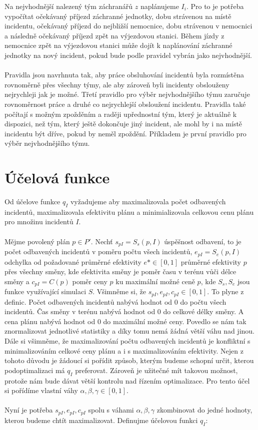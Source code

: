 Na nejvhodnější nalezený tým záchranářů $z$ naplánujeme $I_i$. Pro to je potřeba vypočítat očekávaný příjezd záchranné jednotky, dobu strávenou na místě incidentu, očekávaný příjezd
do nejbližší nemocnice, dobu strávenou v nemocnici a následně očekávaný příjezd zpět na výjezdovou stanici.
Během jízdy z nemocnice zpět na výjezdovou stanici může dojít k naplánování záchranné jednotky na nový incident, pokud bude podle pravidel vybrán jako nejvhodnější.
\\
\\
Pravidla jsou navrhnuta tak, aby práce obsluhování incidentů byla rozmístěna rovnoměrně přes všechny týmy, ale aby zároveň byli incidenty obslouženy nejrychleji jak je možné.
Třetí pravidlo pro výběr nejvhodnějšího týmu zaručuje rovnoměrnost práce a druhé co nejrychlejší obsloužení incidentu.
Pravidla také počítají s možným zpožděním a raději upřednostní tým, který je aktuálně k dispozici, než tým, který ještě dokončuje jiný incident, ale mohl by i na místě incidentu
být dříve, pokud by neměl zpoždění. Příkladem je první pravidlo pro výběr nejvhodnějšího týmu.

\section{Účelová funkce}

Od účelove funkce $q_I$ vyžadujeme aby maximalizovala počet odbavených incidentů, maximalizovala efektivitu plánu a minimializovala celkovou cenu plánu pro množinu incidentů $I$.
\\
\\
Mějme povolený plán $p \in P'$. Nechť $s_{pI} = S_s(p, I)$ úspěšnost odbavení, to je počet odbavených incidentů v poměru počtu všech incidentů,
$e_{pI} = S_e(p, I)$ odchylka od požadované průměrné efektivity $e* \in [0, 1]$ průměrné efektivity $p$ přes všechny směny,
kde efektivita směny je poměr času v terénu vůči délce směny a $c_{pI} = C(p)$ poměr ceny $p$ ku maximální možné ceně $p$,
kde $S_s, S_e$ jsou funkce využívající simulaci $S$. Všimněme si, že $s_{pI}, e_{pI}, c_{pI} \in [0, 1]$.
To plyne z definic. Počet odbavených incidentů nabývá hodnot od 0 do počtu všech incidentů.
Čas směny v terénu nabývá hodnot od 0 do celkové délky směny. A cena plánu nabývá hodnot od 0 do maximální možné ceny.
Povedlo se nám tak znormalizovat jednotlivé statistiky a díky tomu nemá žádná větší váhu nad jinou.
Dále si všimněme, že maximalizování počtu odbavených incidentů je konfliktní s minimalizováním celkové ceny plánu a i s maximalizováním efektivity.
Nejen z tohoto důvodu je žádoucí si pořídit způsob, kterým budeme schopní určit, kterou podoptimalizaci má $q_I$ preferovat.
Zároveň je užitečné mít takovou možnost, protože nám bude dávat větší kontrolu nad řízením optimalizace.
Pro tento účel si pořídíme vlastní váhy $\alpha, \beta, \gamma \in [0, 1]$.
\\
\\
Nyní je potřeba $s_{pI}, e_{pI}, c_{pI}$ spolu s váhami $\alpha, \beta, \gamma$ zkombinovat do jedné hodnoty, kterou budeme chtít maximalizovat.
Definujme účelovou funkci $q_I$:


